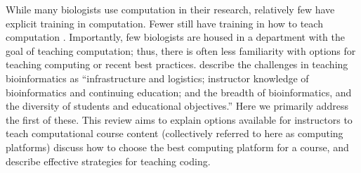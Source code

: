 While many biologists use computation in their research, relatively few have explicit training in computation. 
Fewer still have training in how to teach computation \citep{Williams17}.
Importantly, few biologists are housed in a department with the goal of teaching computation;
thus, there is often less familiarity with options for teaching computing or recent best practices. 
\citet{Cummings10} describe the challenges in teaching bioinformatics as 
``infrastructure and logistics; instructor knowledge of bioinformatics and continuing education; and the breadth of bioinformatics, and the diversity of students and educational objectives.''
Here we primarily address the first of these. 
%
This review aims to explain options available for instructors to teach computational course content
(collectively referred to here as computing platforms)
discuss how to choose the best computing platform for a course, 
and describe effective strategies for teaching coding.

